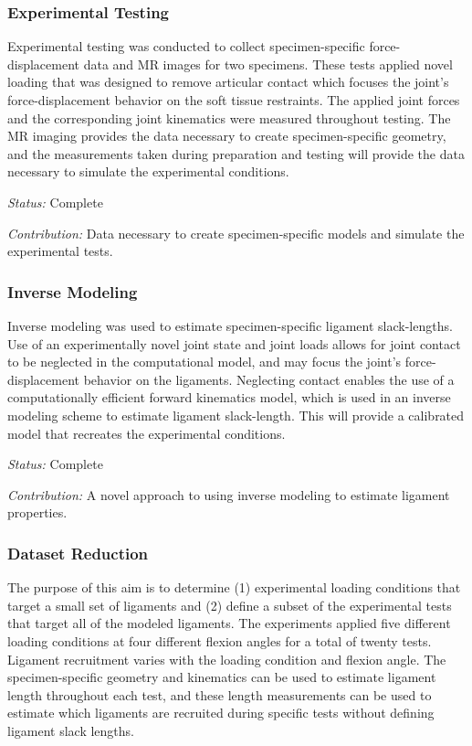 \subsubsection{Experimental Testing}
Experimental testing was conducted to collect specimen-specific force-displacement data and MR images for two specimens. These tests applied novel loading that was designed to remove articular contact which focuses the joint's force-displacement behavior on the soft tissue restraints. The applied joint forces and the corresponding joint kinematics were measured throughout testing. The MR imaging provides the data necessary to create specimen-specific geometry, and the measurements taken during preparation and testing will provide the data necessary to simulate the experimental conditions.

\emph{Status:} Complete

\emph{Contribution:} Data necessary to create specimen-specific models and simulate the experimental tests.
\subsubsection{Inverse Modeling}
Inverse modeling was used to estimate specimen-specific ligament slack-lengths. Use of an experimentally novel joint state and joint loads allows for joint contact to be neglected in the computational model, and may focus the joint's force-displacement behavior on the ligaments. Neglecting contact enables the use of a computationally efficient forward kinematics model, which is used in an inverse modeling scheme to estimate ligament slack-length. This will provide a calibrated model that recreates the experimental conditions. 

\emph{Status:} Complete

\emph{Contribution:} A novel approach to using inverse modeling to estimate ligament properties.
\subsubsection{Dataset Reduction}
The purpose of this aim is to determine (1) experimental loading conditions that target a small set of ligaments and (2) define a subset of the experimental tests that target all of the modeled ligaments. The experiments applied five different loading conditions at four different flexion angles for a total of twenty tests. Ligament recruitment varies with the loading condition and flexion angle. The specimen-specific geometry and kinematics can be used to estimate ligament length throughout each test, and these length measurements can be used to estimate which ligaments are recruited during specific tests without defining ligament slack lengths.

